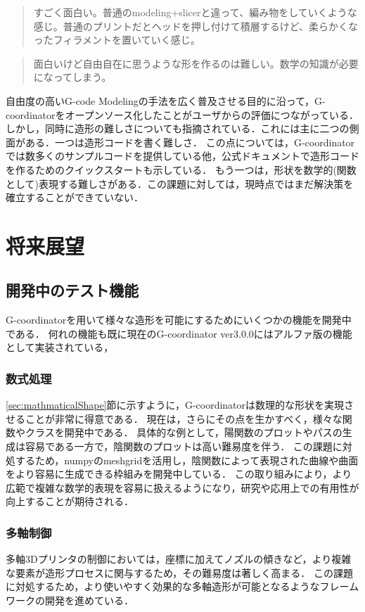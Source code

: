 \documentclass{article}
\begin{document}
\begin{twocolumn}
\begin{quote}
  すごく面白い。普通のmodeling+slicerと違って、編み物をしていくような感じ。普通のプリントだとヘッドを押し付けて積層するけど、柔らかくなったフィラメントを置いていく感じ。
\end{quote}

\begin{quote}
  面白いけど自由自在に思うような形を作るのは難しい。数学の知識が必要になってしまう。
\end{quote}

自由度の高いG-code Modelingの手法を広く普及させる目的に沿って，G-coordinatorをオープンソース化したことがユーザからの評価につながっている．
しかし，同時に造形の難しさについても指摘されている．これには主に二つの側面がある．一つは造形コードを書く難しさ．
この点については，G-coordinatorでは数多くのサンプルコードを提供している他，公式ドキュメント\cite{gcoordinator}で造形コードを作るためのクイックスタートも示している．
もう一つは，形状を数学的(関数として)表現する難しさがある．この課題に対しては，現時点ではまだ解決策を確立することができていない．

\section{将来展望}
\subsection{開発中のテスト機能}
G-coordinatorを用いて様々な造形を可能にするためにいくつかの機能を開発中である．
何れの機能も既に現在のG-coordinator ver3.0.0にはアルファ版の機能として実装されている，
\subsubsection{数式処理}
\ref{sec:mathmaticalShape}節に示すように，G-coordinatorは数理的な形状を実現させることが非常に得意である．
現在は，さらにその点を生かすべく，様々な関数やクラスを開発中である．
具体的な例として，陽関数のプロットやパスの生成は容易である一方で，陰関数のプロットは高い難易度を伴う．
この課題に対処するため，numpyのmeshgridを活用し，陰関数によって表現された曲線や曲面をより容易に生成できる枠組みを開発中している．
この取り組みにより，より広範で複雑な数学的表現を容易に扱えるようになり，研究や応用上での有用性が向上することが期待される．

\subsubsection{多軸制御}
多軸3Dプリンタの制御においては，座標に加えてノズルの傾きなど，より複雑な要素が造形プロセスに関与するため，その難易度は著しく高まる．
この課題に対処するため，より使いやすく効果的な多軸造形が可能となるようなフレームワークの開発を進めている．


\end{twocolumn}
\end{document}
